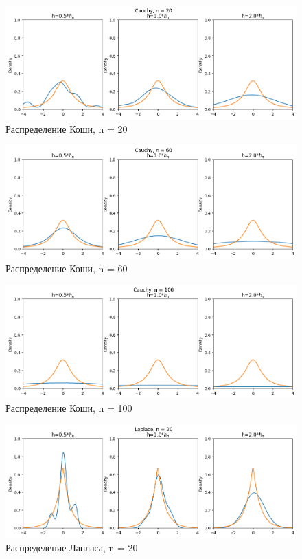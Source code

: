 \begin{figure}[H]
	\includegraphics[width=\textwidth]{tasks/4/res/21.png}
	\caption{Распределение Коши, n = 20} 
\end{figure}
	
\begin{figure}[H]
	\includegraphics[width=\textwidth]{tasks/4/res/22.png}
	\caption{Распределение Коши, n = 60} 
\end{figure}
	
\begin{figure}[H]
	\includegraphics[width=\textwidth]{tasks/4/res/23.png}
	\caption{Распределение Коши, n = 100} 
\end{figure}
	
\begin{figure}[H]
	\includegraphics[width=\textwidth]{tasks/4/res/31.png}
	\caption{Распределение Лапласа, n = 20} 
\end{figure}
	
